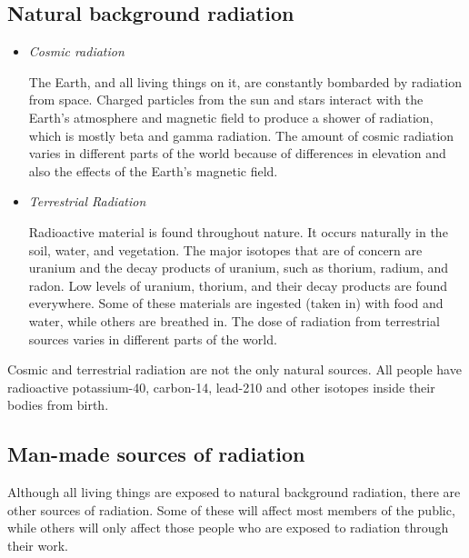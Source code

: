 \subsection{Natural background radiation}
\begin{itemize}
\item{\textit{Cosmic radiation}

The Earth, and all living things on it, are constantly bombarded by radiation from space. Charged particles from the sun and stars interact with the Earth's atmosphere and magnetic field to produce a shower of radiation, which is mostly beta and gamma radiation. The amount of cosmic radiation varies in different parts of the world because of differences in elevation and also the effects of the Earth's magnetic field.
}
\item{\textit{Terrestrial Radiation}

Radioactive material is found throughout nature. It occurs naturally in the soil, water, and vegetation. The major isotopes that are of concern are uranium and the decay products of uranium, such as thorium, radium, and radon. Low levels of uranium, thorium, and their decay products are found everywhere. Some of these materials are ingested (taken in) with food and water, while others are breathed in. The dose of radiation from terrestrial sources varies in different parts of the world.
}
\end{itemize}


\begin{IFact}{
Cosmic and terrestrial radiation are not the only natural sources. All people have radioactive potassium-40, carbon-14, lead-210 and other isotopes inside their bodies from birth.
}
\end{IFact}

\subsection{Man-made sources of radiation}

Although all living things are exposed to natural background radiation, there are other sources of radiation. Some of these will affect most members of the public, while others will only affect those people who are exposed to radiation through their work.

